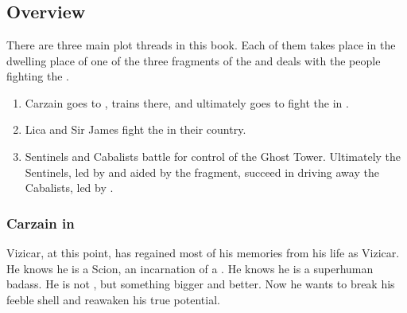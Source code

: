 \chapter[Twilight Angel, Remember]{\TwilightAngelRemember}
 

























\chapter{\TheKenosis}
\section{Overview}
There are three main plot threads in this book. 
Each of them takes place in the dwelling place of one of the three fragments of the \Haskelek{} and deals with the people fighting the \Haskelek. 

\begin{enumerate}
  \item 
    Carzain goes to \Redce{}, trains there, and ultimately goes to fight the \Haskelek{} in \Redce.
  \item
    Lica and Sir James fight the \Haskelek{} in their country.
  \item
    Sentinels and Cabalists battle for control of the Ghost Tower. 
    Ultimately the Sentinels, led by \Nzessuacrith{} and aided by the \Haskelek{} fragment, succeed in driving away the Cabalists, led by \Achsah. 
\end{enumerate}









\subsection{Carzain in \Redce}
Vizicar, at this point, has regained most of his memories from his life as Vizicar. 
He knows he is a Scion, an incarnation of a \malach. 
He knows he is a superhuman badass. 
He is not \human, but something bigger and better. 
Now he wants to break his feeble \human{} shell and reawaken his true potential. 

